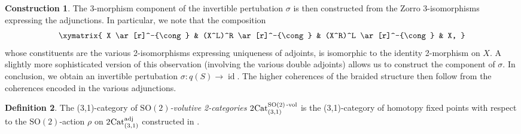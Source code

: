 \documentclass{article}
\newcommand{\id}{\operatorname{id}}%
\newcommand{\Cat}{\operatorname{Cat}}%
\newcommand{\Sotwo}{\operatorname{SO(2)}}
\numberwithin{equation}{section}
\theoremstyle{definition}
\newtheorem{definition}{Definition}[subsection]
\newtheorem{construction}[definition]{Construction}
\theoremstyle{theorem}
\begin{document}
\begin{construction}
    The 3-morphism component of the invertible pertubation $\sigma$ is then constructed from the Zorro 3-isomorphisms expressing the adjunctions. In particular, 
    we note that the composition 
    \begin{equation}
        \xymatrix{
            X \ar[r]^-{\cong} & (X^L)^R \ar[r]^-{\cong} & (X^R)^L \ar[r]^-{\cong} & X,
        }
    \end{equation}
    whose constituents are the various 2-isomorphisms expressing uniqueness of adjoints, is isomorphic to the identity 2-morphism on $X$. A slightly more 
    sophisticated version of this observation (involving the various double adjoints) allows us to construct the component of $\sigma$. In conclusion, 
    we obtain an invertible pertubation $\sigma \colon q(S) \to \id$. The higher coherences of the braided structure then follow from the coherences encoded 
    in the various adjunctions. 
\end{construction}
\begin{definition}
    The (3,1)-category of \emph{$\Sotwo$-volutive 2-categories} $2\hspace{-0.05cm}\Cat^{\Sotwo\text{-vol}}_{(3,1)}$ is the {(3,1)}-category of homotopy fixed points 
    with respect to the $\Sotwo$-action $\rho$ on $2\hspace{-0.05cm}\Cat_{(3,1)}^{\operatorname{adj}}$ constructed in 
    .
\end{definition}
\end{document}
